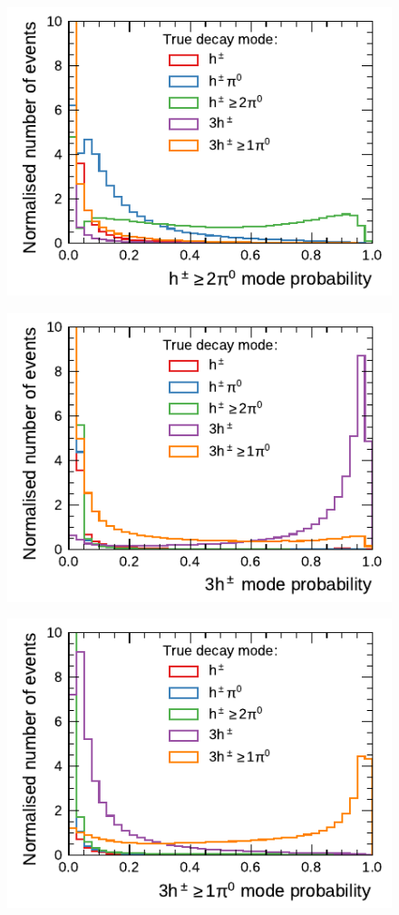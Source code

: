 \begin{minipage}{\textwidth}
\begin{subfigure}{0.48\textwidth}
  \end{subfigure}
  \begin{subfigure}{0.48\textwidth}
    \centering
    \includegraphics{./figures/decay_mode_classification/mode_proba_baseline_ptcut_1_5/proba_1pXn.pdf}
  \end{subfigure}\hfill
  \begin{subfigure}{0.48\textwidth}
    \centering
    \includegraphics{./figures/decay_mode_classification/mode_proba_baseline_ptcut_1_5/proba_3p0n.pdf}
  \end{subfigure}
  \begin{subfigure}{0.48\textwidth}
    \centering
    \includegraphics{./figures/decay_mode_classification/mode_proba_baseline_ptcut_1_5/proba_3pXn.pdf}

\end{subfigure}
\end{minipage}

